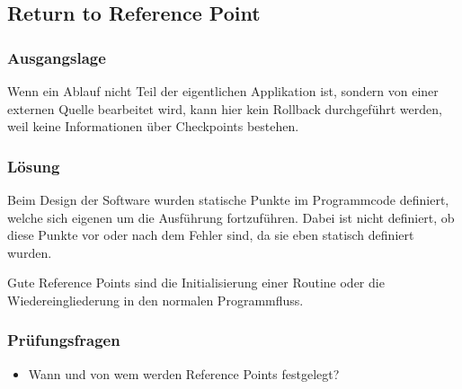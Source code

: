 \subsection{Return to Reference Point}


\subsubsection*{Ausgangslage}


Wenn ein Ablauf nicht Teil der eigentlichen Applikation ist, sondern von einer externen Quelle bearbeitet wird, kann hier kein Rollback durchgeführt werden, weil keine Informationen über Checkpoints bestehen.

\subsubsection*{Lösung}


Beim Design der Software wurden statische Punkte im Programmcode definiert, welche sich eigenen um die Ausführung fortzuführen. Dabei ist nicht definiert, ob diese Punkte vor oder nach dem Fehler sind, da sie eben statisch definiert wurden.

Gute Reference Points sind die Initialisierung einer Routine oder die Wiedereingliederung in den normalen Programmfluss.

\subsubsection*{Prüfungsfragen}

\begin{itemize}
	\item Wann und von wem werden Reference Points festgelegt?
\end{itemize}

